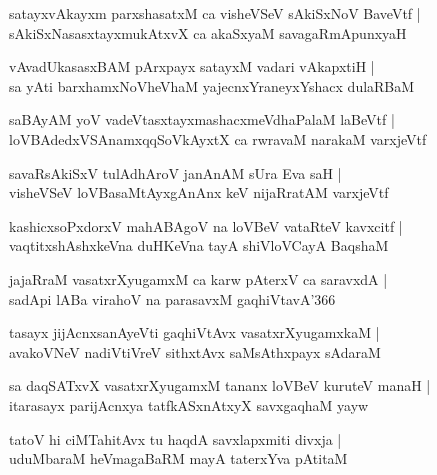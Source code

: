 \documentclass[twoside,12pt,openright]{book}
\newcounter{shloka}[chapter]
\begin{document}
\begin{shloka}%
satayxvAkayxm parxshasatxM ca visheVSeV sAkiSxNoV BaveVtf |\\
sAkiSxNasasxtayxmukAtxvX ca akaSxyaM savagaRmApunxyaH 
\end{shloka}

\begin{shloka}%
vAvadUkasasxBAM pArxpayx satayxM vadari vAkapxtiH |\\
sa yAti barxhamxNoVheVhaM yajecnxYraneyxYshacx dulaRBaM 
\end{shloka}

\begin{shloka}%
saBAyAM yoV vadeVtasxtayxmashacxmeVdhaPalaM laBeVtf |\\
loVBAdedxVSAnamxqqSoVkAyxtX ca rwravaM narakaM varxjeVtf 
\end{shloka}

\begin{shloka}%
savaRsAkiSxV tulAdhAroV janAnAM sUra Eva saH |\\
visheVSeV loVBasaMtAyxgAnAnx keV nijaRratAM varxjeVtf
\end{shloka}

\begin{shloka}%
kashicxsoPxdorxV mahABAgoV na loVBeV vataRteV kavxcitf |\\
vaqtitxshAshxkeVna duHKeVna tayA shiVloVCayA BaqshaM 
\end{shloka}

\begin{shloka}%
jajaRraM vasatxrXyugamxM ca karw pAterxV ca saravxdA |\\
sadApi lABa virahoV na parasavxM gaqhiVtavA\char'366
\end{shloka}

\begin{shloka}%
tasayx jijAcnxsanAyeVti gaqhiVtAvx vasatxrXyugamxkaM |\\
avakoVNeV nadiVtiVreV sithxtAvx saMsAthxpayx sAdaraM 
\end{shloka}

\begin{shloka}%
sa daqSATxvX vasatxrXyugamxM tananx loVBeV kuruteV manaH |\\
itarasayx parijAcnxya tatfkASxnAtxyX savxgaqhaM yayw 
\end{shloka}

\begin{shloka}%
tatoV hi ciMTahitAvx tu haqdA savxlapxmiti divxja |\\
uduMbaraM heVmagaBaRM mayA taterxYva pAtitaM 
\end{shloka}
\end{document}
